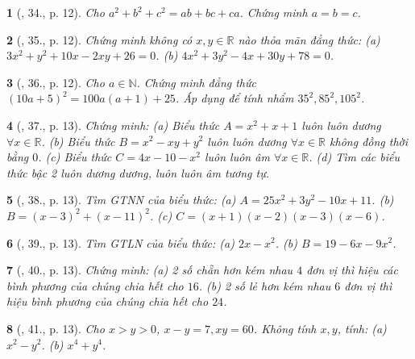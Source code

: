 \documentclass{article}
\newtheorem{baitoan}{}
\begin{document}
\begin{baitoan}[\cite{Tuyen_Toan_8}, 34., p. 12]
	Cho $a^2 + b^2 + c^2 = ab + bc + ca$. Chứng minh $a = b = c$.
\end{baitoan}

\begin{baitoan}[\cite{Tuyen_Toan_8}, 35., p. 12]
	Chứng minh không có $x,y\in\mathbb{R}$ nào thỏa mãn đẳng thức: (a) $3x^2 + y^2 + 10x - 2xy + 26 = 0$. (b) $4x^2 + 3y^2 - 4x + 30y + 78 = 0$.
\end{baitoan}

\begin{baitoan}[\cite{Tuyen_Toan_8}, 36., p. 12]
	Cho $a\in\mathbb{N}$. Chứng minh đẳng thức $(10a + 5)^2 = 100a(a + 1) + 25$. Áp dụng để tính nhẩm $35^2,85^2,105^2$.
\end{baitoan}

\begin{baitoan}[\cite{Tuyen_Toan_8}, 37., p. 13]
	Chứng minh: (a) Biểu thức $A = x^2 + x + 1$ luôn luôn dương $\forall x\in\mathbb{R}$. (b) Biểu thức $B = x^2 - xy + y^2$ luôn luôn dương $\forall x\in\mathbb{R}$ không đồng thời bằng $0$. (c) Biểu thức $C = 4x - 10 - x^2$ luôn luôn âm $\forall x\in\mathbb{R}$. (d) Tìm các biểu thức bậc 2 luôn dương dương, luôn luôn âm tương tự.
\end{baitoan}

\begin{baitoan}[\cite{Tuyen_Toan_8}, 38., p. 13]
	Tìm {\rm GTNN} của biểu thức: (a) $A = 25x^2 + 3y^2 - 10x + 11$. (b) $B = (x - 3)^2 + (x - 11)^2$. (c) $C = (x + 1)(x - 2)(x - 3)(x - 6)$.
\end{baitoan}

\begin{baitoan}[\cite{Tuyen_Toan_8}, 39., p. 13]
	Tìm {\rm GTLN} của biểu thức: (a) $2x - x^2$. (b) $B = 19 - 6x - 9x^2$.
\end{baitoan}

\begin{baitoan}[\cite{Tuyen_Toan_8}, 40., p. 13]
	Chứng minh: (a) 2 số chẵn hơn kém nhau $4$ đơn vị thì hiệu các bình phương của chúng chia hết cho $16$. (b) 2 số lẻ hơn kém nhau $6$ đơn vị thì hiệu bình phương của chúng chia hết cho $24$.
\end{baitoan}

\begin{baitoan}[\cite{Tuyen_Toan_8}, 41., p. 13]
	Cho $x > y > 0$, $x - y = 7,xy = 60$. Không tính $x,y$, tính: (a) $x^2 - y^2$. (b) $x^4 + y^4$.
\end{baitoan}
\end{document}
